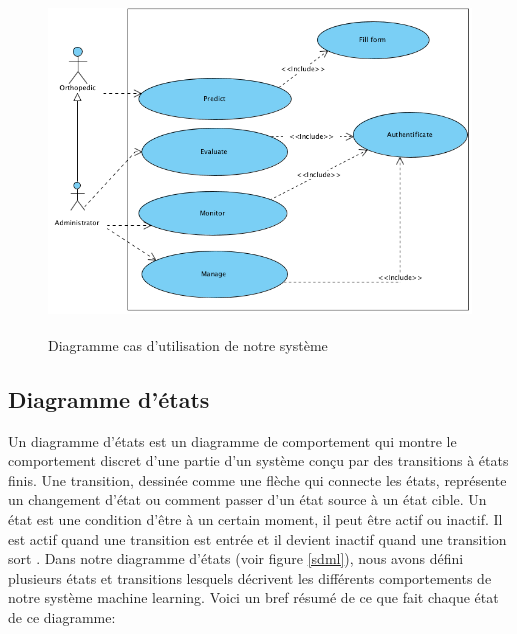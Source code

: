 \documentclass[12pt, french]{report}
\begin{document}
\begin{figure}[h]
	\includegraphics[width=17cm, height =9cm]{images/UseCaseDiag.png}
	\caption{Diagramme cas d'utilisation de notre système}
	\label{usecase}
\end{figure}  

\subsection{Diagramme d'états}
Un diagramme d'états est un diagramme de comportement qui montre le comportement discret d'une partie d'un système conçu par des transitions à états finis. Une transition, dessinée comme une flèche qui connecte les états, représente un changement d'état ou comment passer d'un état source à un état cible. Un état est une condition d'être à un certain moment, il peut être actif ou inactif. Il est actif quand une transition est entrée et il devient inactif quand une transition sort \cite[~chapter 14]{key48}. Dans notre diagramme d'états (voir figure \ref{sdml}), nous avons défini plusieurs états et transitions lesquels décrivent les différents comportements de notre système machine learning. Voici un bref résumé de ce que fait chaque état de ce diagramme: 
\end{document}
